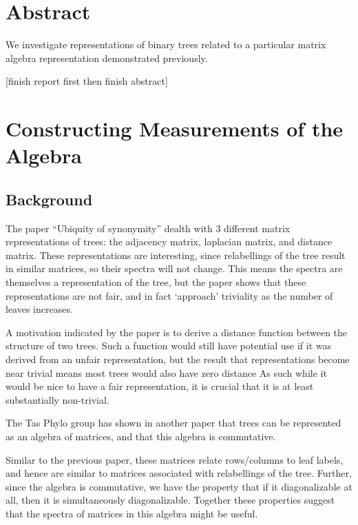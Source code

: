 \documentclass{report}
\begin{document}
\section{Abstract}

We investigate representations of binary trees related to a particular matrix
algebra representation demonstrated previously.

[finish report first then finish abstract]

\section{Constructing Measurements of the Algebra}

\subsection{Background}

The paper ``Ubiquity of synonymity'' dealth with 3 different matrix
representations of trees: the adjacency matrix, laplacian matrix, and distance
matrix.
These representations are interesting, since relabellings of the tree result
in similar matrices, so their spectra will not change.
This means the spectra are themselves a representation of the tree, but the
paper shows that these representations are not fair, and in fact `approach'
triviality as the number of leaves increases.

A motivation indicated by the paper is to derive a distance function between
the structure of two trees.
Such a function would still have potential use if it was derived from an unfair
representation, but the result that representations become near trivial means
most trees would also have zero distance
As such while it would be nice to have a fair representation, it is crucial
that it is at least substantially non-trivial.

The Tas Phylo group has shown in another paper that trees can be represented as
an algebra of matrices, and that this algebra is commutative.

Similar to the previous paper, these matrices relate rows/columns to leaf
labels, and hence are similar to matrices associated with relabellings of the
tree.
Further, since the algebra is commutative, we have the property that if it
diagonalizable at all, then it is simultaneously diagonalizable.
Together these properties suggest that the spectra of matrices in this algebra
might be useful.
\end{document}
